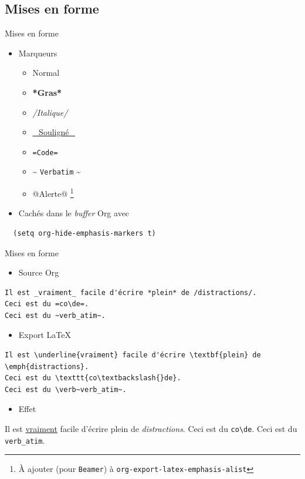 \documentclass[presentation,t,hideothersubsections]{beamer}
\begin{document}
\subsection{Mises en forme}
\label{sec-2-5}

\begin{frame}[fragile,label=sec-2-5-1]{Mises en forme}
 \begin{itemize}
\item Marqueurs
\begin{itemize}
\item Normal
\item \textbf{*Gras*}
\item \emph{/Italique/}
\item \underline{\_Souligné\_}
\item \texttt{=Code=}
\item \textasciitilde{} \verb~Verbatim~ \textasciitilde{}
\item \alert{@Alerte@} \footnote{À ajouter (pour \verb~Beamer~) à \texttt{org-export-latex-emphasis-alist}}
\end{itemize}

\item Cachés dans le \emph{buffer} Org avec
\end{itemize}

\lstset{language=TeX,numbers=none}
\begin{lstlisting}
  (setq org-hide-emphasis-markers t)
\end{lstlisting}
\end{frame}
\begin{frame}[fragile,label=sec-2-5-2]{Mises en forme}
 \begin{itemize}
\item Source Org
\end{itemize}

\lstset{language=org,numbers=none}
\begin{lstlisting}
Il est _vraiment_ facile d'écrire *plein* de /distractions/.
Ceci est du =co\de=.
Ceci est du ~verb_atim~.
\end{lstlisting}

\begin{itemize}
\item Export \LaTeX{}
\end{itemize}

\lstset{language=TeX,numbers=none}
\begin{lstlisting}
Il est \underline{vraiment} facile d'écrire \textbf{plein} de
\emph{distractions}.
Ceci est du \texttt{co\textbackslash{}de}.
Ceci est du \verb~verb_atim~.
\end{lstlisting}

\begin{itemize}
\item Effet
\end{itemize}

Il est \underline{vraiment} facile d'écrire \alert{plein} de \emph{distractions}.
Ceci est du \texttt{co\textbackslash{}de}.
Ceci est du \verb~verb_atim~.
\end{frame}
\end{document}
